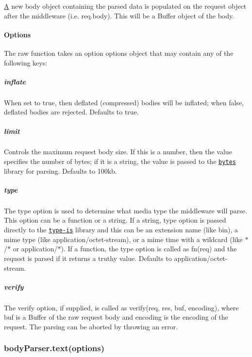 \hyperlink{class_a}{A} new {\ttfamily body} object containing the parsed data is populated on the {\ttfamily request} object after the middleware (i.\+e. {\ttfamily req.\+body}). This will be a {\ttfamily Buffer} object of the body.

\paragraph*{Options}

The {\ttfamily raw} function takes an option {\ttfamily options} object that may contain any of the following keys\+:

\subparagraph*{inflate}

When set to {\ttfamily true}, then deflated (compressed) bodies will be inflated; when {\ttfamily false}, deflated bodies are rejected. Defaults to {\ttfamily true}.

\subparagraph*{limit}

Controls the maximum request body size. If this is a number, then the value specifies the number of bytes; if it is a string, the value is passed to the \href{https://www.npmjs.com/package/bytes}{\tt bytes} library for parsing. Defaults to {\ttfamily \textquotesingle{}100kb\textquotesingle{}}.

\subparagraph*{type}

The {\ttfamily type} option is used to determine what media type the middleware will parse. This option can be a function or a string. If a string, {\ttfamily type} option is passed directly to the \href{https://www.npmjs.org/package/type-is#readme}{\tt type-\/is} library and this can be an extension name (like {\ttfamily bin}), a mime type (like {\ttfamily application/octet-\/stream}), or a mime time with a wildcard (like {\ttfamily $\ast$/$\ast$} or {\ttfamily application/$\ast$}). If a function, the {\ttfamily type} option is called as {\ttfamily fn(req)} and the request is parsed if it returns a truthy value. Defaults to {\ttfamily application/octet-\/stream}.

\subparagraph*{verify}

The {\ttfamily verify} option, if supplied, is called as {\ttfamily verify(req, res, buf, encoding)}, where {\ttfamily buf} is a {\ttfamily Buffer} of the raw request body and {\ttfamily encoding} is the encoding of the request. The parsing can be aborted by throwing an error.

\subsubsection*{body\+Parser.\+text(options)}

